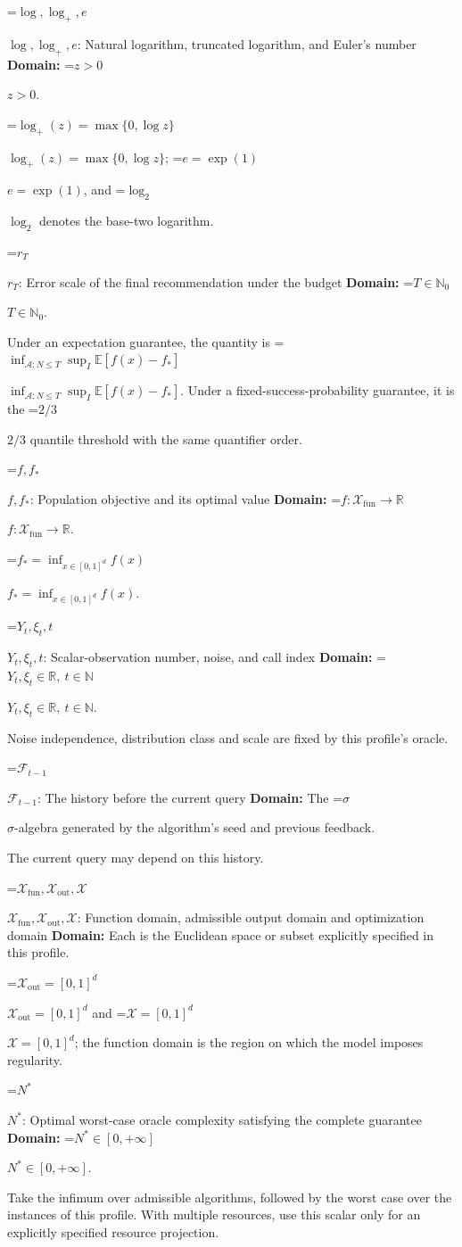 \documentclass[10pt,a4paper]{article}
\newcommand{\AtlasMath}[1]{\par\begingroup\centering\setbox0=\hbox{$\displaystyle #1$}\ifdim\wd0>1.4\linewidth\typeout{ATLAS WIDE FORMULA: \the\wd0}\fi\ifdim\wd0>\linewidth\resizebox{\linewidth}{!}{\box0}\else\box0\fi\par\endgroup}
\newcommand{\AtlasInlineMath}[1]{\begingroup\setbox0=\hbox{$#1$}\ifdim\wd0>.4\linewidth\endgroup\AtlasMath{#1}\else\endgroup$#1$\fi}
\begin{document}
\AtlasInlineMath{\log,\log_+,e}: Natural logarithm, truncated logarithm, and Euler's number \textbf{Domain:} \AtlasInlineMath{z>0}.

\AtlasInlineMath{\log_+(z)=\max\{0,\log z\}}; \AtlasInlineMath{e=\exp(1)}, and \AtlasInlineMath{\log_2} denotes the base-two logarithm.

\AtlasInlineMath{r_T}: Error scale of the final recommendation under the budget \textbf{Domain:} \AtlasInlineMath{T\in\mathbb{N}_0}.

Under an expectation guarantee, the quantity is \AtlasInlineMath{\inf_{\mathcal{A}:N\le T}\sup_I\mathbb{E}[f(\widehat{x})-f_*]}. Under a fixed-success-probability guarantee, it is the \AtlasInlineMath{2/3} quantile threshold with the same quantifier order.

\AtlasInlineMath{f,f_*}: Population objective and its optimal value \textbf{Domain:} \AtlasInlineMath{f:\mathcal{X}_{\mathrm{fun}}\to\mathbb{R}}.

\AtlasInlineMath{f_*=\inf_{x\in [0,1]^d}f(x)}.

\AtlasInlineMath{Y_t,\xi_t,t}: Scalar-observation number, noise, and call index \textbf{Domain:} \AtlasInlineMath{Y_t,\xi_t\in\mathbb{R},\ t\in\mathbb{N}}.

Noise independence, distribution class and scale are fixed by this profile's oracle.

\AtlasInlineMath{\mathcal{F}_{t-1}}: The history before the current query \textbf{Domain:} The \AtlasInlineMath{\sigma}-algebra generated by the algorithm's seed and previous feedback.

The current query may depend on this history.

\AtlasInlineMath{\mathcal{X}_{\mathrm{fun}},\mathcal{X}_{\mathrm{out}},\mathcal{X}}: Function domain, admissible output domain and optimization domain \textbf{Domain:} Each is the Euclidean space or subset explicitly specified in this profile.

\AtlasInlineMath{\mathcal{X}_{\mathrm{out}}=[0,1]^d} and \AtlasInlineMath{\mathcal{X}=[0,1]^d}; the function domain is the region on which the model imposes regularity.

\AtlasInlineMath{N^*}: Optimal worst-case oracle complexity satisfying the complete guarantee \textbf{Domain:} \AtlasInlineMath{N^*\in[0,+\infty]}.

Take the infimum over admissible algorithms, followed by the worst case over the instances of this profile. With multiple resources, use this scalar only for an explicitly specified resource projection.
\end{document}
